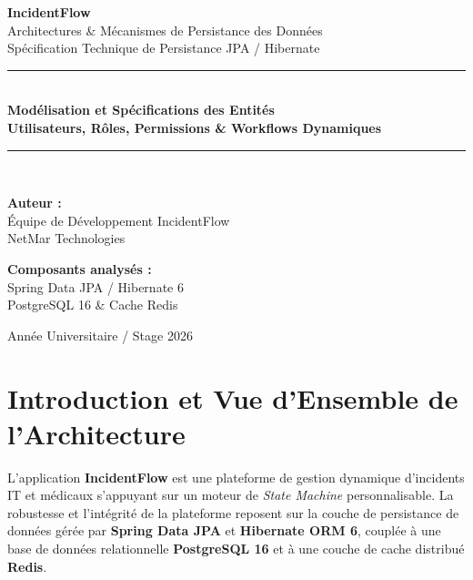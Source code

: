 \documentclass[11pt,a4paper]{article}
\begin{document}
\begin{titlepage}
    \centering
    \vspace*{1.5cm}
    
    {\Huge \bfseries \color{navyprimary} IncidentFlow}\\[0.4cm]
    {\LARGE \color{blueaccent} Architectures \& Mécanismes de Persistance des Données}\\[0.2cm]
    {\large \color{slategray} Spécification Technique de Persistance JPA / Hibernate}\\[1.5cm]
    
    \rule{\linewidth}{0.5mm}\\[0.6cm]
    {\Large \bfseries Modélisation et Spécifications des Entités}\\[0.3cm]
    {\large \textbf{Utilisateurs, Rôles, Permissions \& Workflows Dynamiques}}\\[0.6cm]
    \rule{\linewidth}{0.5mm}\\[2cm]
    
    \begin{minipage}{0.45\textwidth}
        \begin{flushleft} \large
            \textbf{Auteur :}\\
            Équipe de Développement IncidentFlow\\
            NetMar Technologies
        \end{flushleft}
    \end{minipage}
    \begin{minipage}{0.45\textwidth}
        \begin{flushright} \large
            \textbf{Composants analysés :}\\
            Spring Data JPA / Hibernate 6\\
            PostgreSQL 16 \& Cache Redis
        \end{flushright}
    \end{minipage}

    \vfill
    {\large Année Universitaire / Stage 2026}
\end{titlepage}

\tableofcontents
\newpage

\section{Introduction et Vue d'Ensemble de l'Architecture}

L'application \textbf{IncidentFlow} est une plateforme de gestion dynamique d'incidents IT et médicaux s'appuyant sur un moteur de \textit{State Machine} personnalisable. La robustesse et l'intégrité de la plateforme reposent sur la couche de persistance de données gérée par \textbf{Spring Data JPA} et \textbf{Hibernate ORM 6}, couplée à une base de données relationnelle \textbf{PostgreSQL 16} et à une couche de cache distribué \textbf{Redis}.
\end{document}
